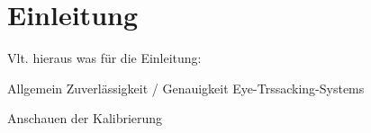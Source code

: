 \chapter{Einleitung}
Vlt. hieraus was für die Einleitung: \cite{Rogers.2019}

Allgemein Zuverlässigkeit / Genauigkeit Eye-Trssacking-Systems

Anschauen der Kalibrierung  